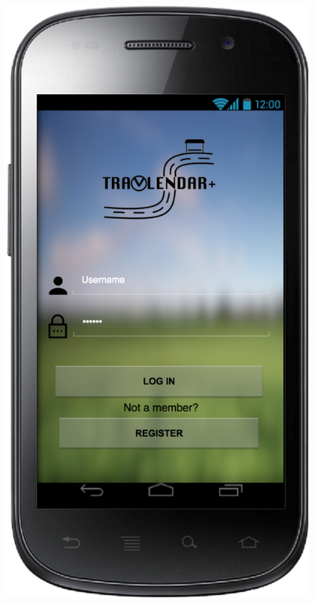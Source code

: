 \documentclass[a4paper,leqno]{article}
\begin{document}
\newpage
\begin{figure}
	\begin{minipage}[!h]{0.45\linewidth}
		\centering
		\includegraphics[scale=0.15]{access}
	\end{minipage}
	\hspace{0.5cm}

\end{figure}
\end{document}
